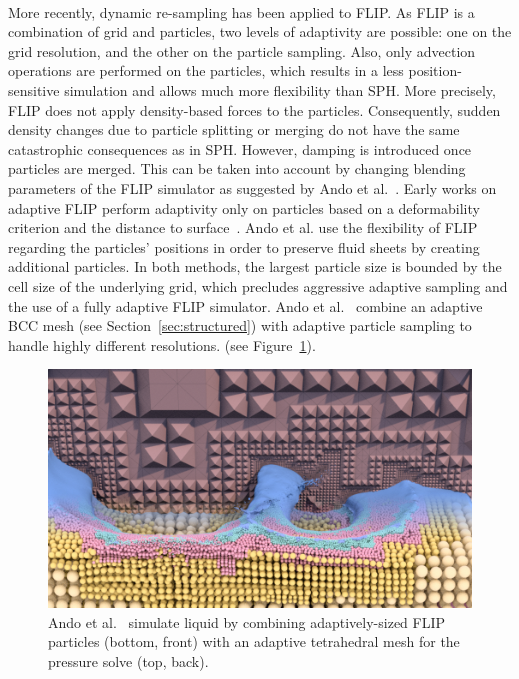 \paragraph*{}
More recently, dynamic re-sampling has been applied to FLIP. As FLIP is a combination of grid and particles, two levels of adaptivity are possible: one on the grid resolution, and the other on the particle sampling. Also, only advection operations are performed on the particles, which results in a less position-sensitive simulation and allows much more flexibility than SPH. More precisely, FLIP does not apply density-based forces to the particles. Consequently, sudden density changes due to particle splitting or merging do not have the same catastrophic consequences as in SPH. However, damping is introduced once particles are merged. This can be taken into account by changing blending parameters of the FLIP simulator as suggested by Ando et al.~\cite{Ando2012}.
Early works on adaptive FLIP perform adaptivity only on particles based on a deformability criterion and the distance to surface~\cite{Hong2008FLIP, Ando2012}. Ando et al. use the flexibility of FLIP regarding the particles' positions in order to preserve fluid sheets by creating additional particles.
In both methods, the largest particle size is bounded by the cell size of the underlying grid, which precludes aggressive adaptive sampling and the use of a fully adaptive FLIP simulator. Ando et al.~\cite{Ando2013} combine an adaptive BCC mesh (see Section~\ref{sec:structured}) with adaptive particle sampling to handle highly different resolutions. (see Figure~\ref{fig:Ando2013}).
\begin{figure}[!t]
	\centering
	\includegraphics[width=0.8\linewidth]{images/starAdaptivity-cgf2016/Ando2013_3.png}
	\caption[STAR adaptivity: Hybrid refinement of meshes and particles]{Ando et al.~\cite{Ando2013} simulate liquid by combining adaptively-sized FLIP particles (bottom, front) with an adaptive tetrahedral mesh for the pressure solve (top, back).}
	\label{fig:Ando2013}
\end{figure}
